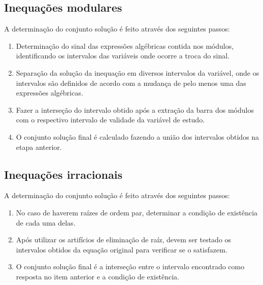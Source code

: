 \documentclass{article}
\begin{document}
\subsection{Inequações modulares}
A determinação do conjunto solução é feito através dos seguintes passos:
\begin{enumerate}
    \item Determinação do sinal das expressões algébricas contida nos módulos, identificando os intervalos das variáveis onde ocorre a troca do sinal.
    \item Separação da solução da inequação em diversos intervalos da variável, onde os intervalos são definidos de acordo com a mudança de pelo menos uma das expressões algébricas.
    \item Fazer a interseção do intervalo obtido após a extração da barra dos módulos com o respectivo intervalo de validade da variável de estudo.
    \item O conjunto solução final é calculado fazendo a união dos intervalos obtidos na etapa anterior.
\end{enumerate}

\subsection{Inequações irracionais}
A determinação do conjunto solução é feito através dos seguintes passos:
\begin{enumerate}
    \item No caso de haverem raízes de ordem par, determinar a condição de existência de cada uma delas.
    \item Após utilizar os artifícios de eliminação de raíz, devem ser testado os intervalos obtidos da equação original para verificar se o satisfazem.
    \item O conjunto solução final é a interseção entre o intervalo encontrado como resposta no item anterior e a condição de existência.
\end{enumerate}
\end{document}
